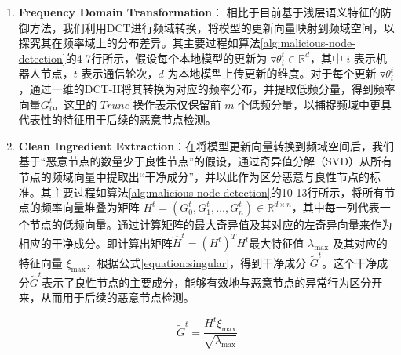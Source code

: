 \documentclass[lettersize,journal]{IEEEtran}
\begin{document}
\begin{enumerate}
\item \textbf{Frequency Domain Transformation}：
相比于目前基于浅层语义特征的防御方法，我们利用DCT进行频域转换，将模型的更新向量映射到频域空间，以探究其在频率域上的分布差异。其主要过程如算法\ref{alg:malicious-node-detection}的4-7行所示，假设每个本地模型的更新为 \(\triangledown \theta_i^t \in \mathbb{R}^d\)，其中 \(i\) 表示机器人节点，\(t\) 表示通信轮次，\(d\) 为本地模型上传更新的维度。对于每个更新 \(\triangledown \theta_i^t\)，通过一维的DCT-II将其转换为对应的频率分布，并提取低频分量，得到频率向量\(G_i^t\)。这里的 $Trunc$ 操作表示仅保留前 $m$ 个低频分量，以捕捉频域中更具代表性的特征用于后续的恶意节点检测。




\item \textbf{Clean Ingredient Extraction}：在将模型更新向量转换到频域空间后，我们基于“恶意节点的数量少于良性节点”的假设，通过奇异值分解（SVD）从所有节点的频域向量中提取出“干净成分”，并以此作为区分恶意与良性节点的标准。其主要过程如算法\ref{alg:malicious-node-detection}的10-13行所示，将所有节点的频率向量堆叠为矩阵 \(H^t = ({G_0^t}, {G_1^t}, \ldots, {G_{n}^t}) \in \mathbb{R}^{d \times n}\)，其中每一列代表一个节点的低频向量。通过计算矩阵的最大奇异值及其对应的左奇异向量来作为相应的干净成分。即计算出矩阵\(\hat{H}^t = (H^t)^{T} H^t\)最大特征值 \(\lambda_{\text{max}}\) 及其对应的特征向量 \(\xi_{\text{max}}\)，根据公式\ref{equation:singular}，得到干净成分 \(\tilde{G}^t\)。这个干净成分\(\tilde{G}^t\)表示了良性节点的主要成分，能够有效地与恶意节点的异常行为区分开来，从而用于后续的恶意节点检测。

\begin{equation}
\tilde{G}^t = \frac{H^t \xi_{\text{max}}}{\sqrt{\lambda_{\text{max}}}}
\label{equation:singular}
\end{equation}



\end{enumerate}
\end{document}
